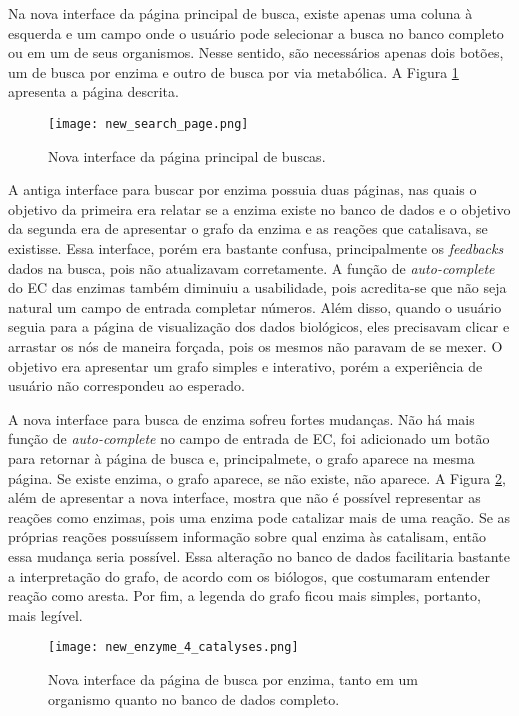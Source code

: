 \indent Na nova interface da página principal de busca, existe apenas uma coluna à esquerda e um campo onde o usuário pode selecionar a busca no banco completo ou em um de seus organismos. Nesse sentido, são necessários apenas dois botões, um de busca por enzima e outro de busca por via metabólica. A Figura \ref{fig:new_search_page} apresenta a página descrita.

\begin{figure}[!h]
    \centering
    \texttt{[image: new\_search\_page.png]}
    \caption{Nova interface da página principal de buscas.}
    \label{fig:new_search_page}
\end{figure}

\indent A antiga interface para buscar por enzima possuia duas páginas, nas quais o objetivo da primeira era relatar se a enzima existe no banco de dados e o objetivo da segunda era de apresentar o grafo da enzima e as reações que catalisava, se existisse. Essa interface, porém era bastante confusa, principalmente os \textit{feedbacks} dados na busca, pois não atualizavam corretamente. A função de \textit{auto-complete} do EC das enzimas também diminuiu a usabilidade, pois acredita-se que não seja natural um campo de entrada completar números. Além disso, quando o usuário seguia para a página de visualização dos dados biológicos, eles precisavam clicar e arrastar os nós de maneira forçada, pois os mesmos não paravam de se mexer. O objetivo era apresentar um grafo simples e interativo, porém a experiência de usuário não correspondeu ao esperado.

\indent A nova interface para busca de enzima sofreu fortes mudanças. Não há mais função de \textit{auto-complete} no campo de entrada de EC, foi adicionado um botão para retornar à página de busca e, principalmete, o grafo aparece na mesma página. Se existe enzima, o grafo aparece, se não existe, não aparece. A Figura \ref{fig:new_enzyme_4_catalyses}, além de apresentar a nova interface, mostra que não é possível representar as reações como enzimas, pois uma enzima pode catalizar mais de uma reação. Se as próprias reações possuíssem informação sobre qual enzima às catalisam, então essa mudança seria possível. Essa alteração no banco de dados facilitaria bastante a interpretação do grafo, de acordo com os biólogos, que costumaram entender reação como aresta. Por fim, a legenda do grafo ficou mais simples, portanto, mais legível.

\begin{figure}[!h]
	\centering
	\texttt{[image: new\_enzyme\_4\_catalyses.png]}
	\caption{Nova interface da página de busca por enzima, tanto em um organismo quanto no banco de dados completo.}
	\label{fig:new_enzyme_4_catalyses}
\end{figure}


